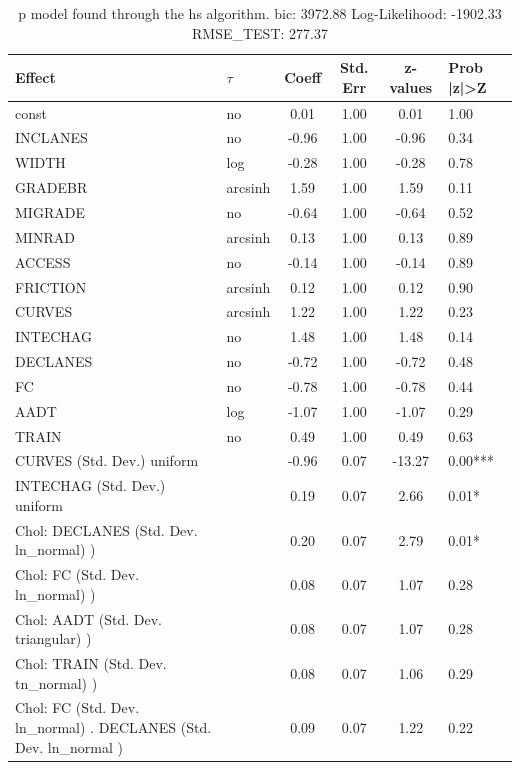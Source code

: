 \begin{table}
	\caption{p model found through the hs algorithm. bic: 3972.88 Log-Likelihood: -1902.33 RMSE_TEST: 277.37}
	\begin{center}
		\begin{tabular}{|l|l|c|c|c|l|}
			\hline
			Effect & $\tau$ & Coeff & Std. Err & z-values & Prob |z|>Z \\
			\hline
			const & no & 0.01 & 1.00 & 0.01 & 1.00 \\
			\hline
			INCLANES & no & -0.96 & 1.00 & -0.96 & 0.34 \\
			\hline
			WIDTH & log & -0.28 & 1.00 & -0.28 & 0.78 \\
			\hline
			GRADEBR & arcsinh & 1.59 & 1.00 & 1.59 & 0.11 \\
			\hline
			MIGRADE & no & -0.64 & 1.00 & -0.64 & 0.52 \\
			\hline
			MINRAD & arcsinh & 0.13 & 1.00 & 0.13 & 0.89 \\
			\hline
			ACCESS & no & -0.14 & 1.00 & -0.14 & 0.89 \\
			\hline
			FRICTION & arcsinh & 0.12 & 1.00 & 0.12 & 0.90 \\
			\hline
			CURVES & arcsinh & 1.22 & 1.00 & 1.22 & 0.23 \\
			\hline
			INTECHAG & no & 1.48 & 1.00 & 1.48 & 0.14 \\
			\hline
			DECLANES & no & -0.72 & 1.00 & -0.72 & 0.48 \\
			\hline
			FC & no & -0.78 & 1.00 & -0.78 & 0.44 \\
			\hline
			AADT & log & -1.07 & 1.00 & -1.07 & 0.29 \\
			\hline
			TRAIN & no & 0.49 & 1.00 & 0.49 & 0.63 \\
			\hline
			CURVES (Std. Dev.) uniform &  & -0.96 & 0.07 & -13.27 & 0.00*** \\
			\hline
			INTECHAG (Std. Dev.) uniform &  & 0.19 & 0.07 & 2.66 & 0.01* \\
			\hline
			 Chol: DECLANES (Std. Dev. ln_normal) ) &  & 0.20 & 0.07 & 2.79 & 0.01* \\
			\hline
			 Chol: FC (Std. Dev. ln_normal) ) &  & 0.08 & 0.07 & 1.07 & 0.28 \\
			\hline
			 Chol: AADT (Std. Dev. triangular) ) &  & 0.08 & 0.07 & 1.07 & 0.28 \\
			\hline
			 Chol: TRAIN (Std. Dev. tn_normal) ) &  & 0.08 & 0.07 & 1.06 & 0.29 \\
			\hline
			 Chol: FC (Std. Dev. ln_normal) . DECLANES (Std. Dev.   ln_normal ) &  & 0.09 & 0.07 & 1.22 & 0.22 \\

\end{tabular}
\end{center}
\end{table}
